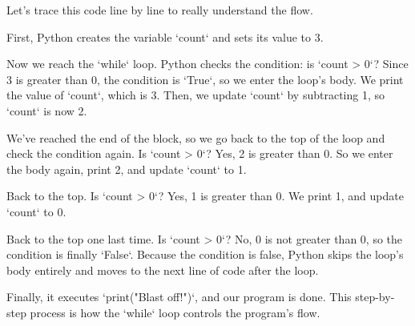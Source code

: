 \documentclass{beamer}
\begin{document}
\begin{frame}[fragile]
    \begin{note}
    Let's trace this code line by line to really understand the flow.

    First, Python creates the variable `count` and sets its value to 3.

    Now we reach the `while` loop. Python checks the condition: is `count > 0`? Since 3 is greater than 0, the condition is `True`, so we enter the loop's body. We print the value of `count`, which is 3. Then, we update `count` by subtracting 1, so `count` is now 2.

    We've reached the end of the block, so we go back to the top of the loop and check the condition again. Is `count > 0`? Yes, 2 is greater than 0. So we enter the body again, print 2, and update `count` to 1.

    Back to the top. Is `count > 0`? Yes, 1 is greater than 0. We print 1, and update `count` to 0.

    Back to the top one last time. Is `count > 0`? No, 0 is not greater than 0, so the condition is finally `False`. Because the condition is false, Python skips the loop's body entirely and moves to the next line of code after the loop.

    Finally, it executes `print("Blast off!")`, and our program is done. This step-by-step process is how the `while` loop controls the program's flow.
    \end{note}
\end{frame}
\end{document}
